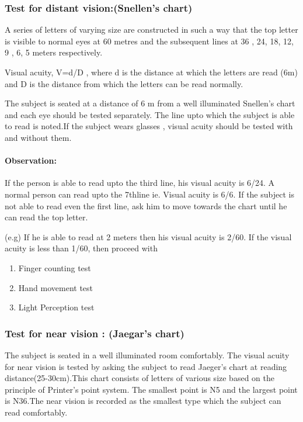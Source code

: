 \documentclass[a4paper,12pt,openany,oneside]{book}
\begin{document}
		\subsubsection*{Test for distant vision:(Snellen's chart)}
		A series of letters of varying size are constructed in such a way that the top letter is visible to normal eyes at 60 metres and the subsequent lines at 36 , 24, 18, 12, 9 , 6, 5 meters respectively. 
		\par
		Visual acuity, V=d/D , where d is the distance at which the letters are read (6m) and D is the distance from which the letters can be read normally.
		\par
		The subject is seated at a distance of 6 m from a well illuminated Snellen's chart and each eye should be tested separately. The line upto which the subject is able to read is noted.If the subject wears glasses , visual acuity should be tested with and without them.
		\paragraph{Observation:}
		If the person is able to read upto the third line, his visual acuity is 6/24. A normal person can read upto the 7thline ie. Visual acuity is 6/6. If the subject is not able to read even the first line, ask him to move towards the chart until he can read the top letter.
		\par
		(e.g) If he is able to read at 2 meters then his visual acuity is 2/60. If the visual acuity is less than 1/60, then proceed with
		\begin{enumerate}
\item{Finger counting test}
\item{Hand movement test}
\item{Light Perception test}
		\end{enumerate}

		\subsubsection*{Test for near vision : (Jaegar’s chart)}
			The subject is seated in a well illuminated room comfortably. The visual acuity for near vision is tested by asking the subject to read Jaeger's chart at reading distance(25-30cm).This chart consists of letters of various size based on the principle of  Printer’s point system. The smallest point is N5 and the largest point is N36.The near vision is recorded as the smallest type which the subject can read comfortably.
\end{document}
